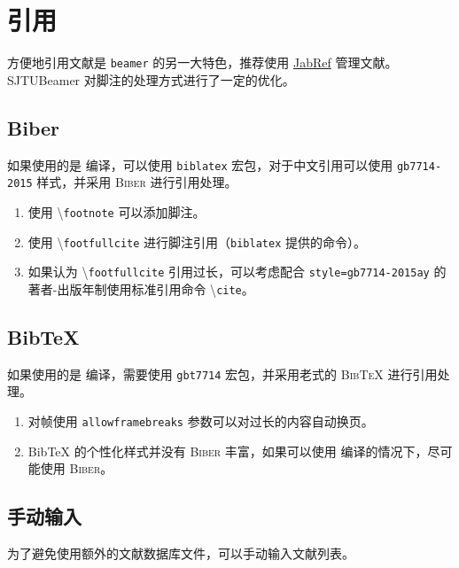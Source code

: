 \documentclass[
    UTF8,
    heading=true,
    12pt,
    a4paper
]{ctexrep}
\newenvironment{commentlist}
{\begin{enumerate}\small}
{\end{enumerate}}
\newcommand{\cmd}[1]{\textbackslash{}\texttt{#1}}
\newcommand{\cls}[1]{\texttt{#1}}
\newcommand{\pkg}[1]{\texttt{#1}}
\newcommand{\opt}[1]{\texttt{#1}}
\def\themename{\textsf{SJTUBeamer}}
\begin{document}
\chapter{引用}

方便地引用文献是 \cls{beamer} 的另一大特色，推荐使用
\href{https://www.jabref.org/}{JabRef}
管理文献。\themename{} 对脚注的处理方式进行了一定的优化。

\section{Biber}

\faApple{} \faLinux{} 如果使用的是 
编译，可以使用 \pkg{biblatex} 宏包，对于中文引用可以使用
\opt{gb7714-2015} 样式，并采用 \textsc{Biber} 进行引用处理。


\begin{commentlist}
  \item 使用 \cmd{footnote} 可以添加脚注。
  \item 使用 \cmd{footfullcite}
  进行脚注引用（\pkg{biblatex} 提供的命令）。
  \item 如果认为 \cmd{footfullcite} 引用过长，可以考虑配合
  \opt{style=gb7714-2015ay} 的著者-出版年制使用标准引用命令
  \cmd{cite}。
\end{commentlist}

\section{Bib\TeX{}}

\faWindows 如果使用的是  编译，需要使用
\pkg{gbt7714} 宏包，并采用老式的 \textsc{Bib\TeX{}}
进行引用处理。


\begin{commentlist}
  \item 对帧使用 \verb"allowframebreaks"
  参数可以对过长的内容自动换页。
  \item Bib\TeX{} 的个性化样式并没有 \textsc{Biber}
  丰富，如果可以使用  编译的情况下，尽可能使用
  \textsc{Biber}。
\end{commentlist}

\section{手动输入}

为了避免使用额外的文献数据库文件，可以手动输入文献列表。
\end{document}
